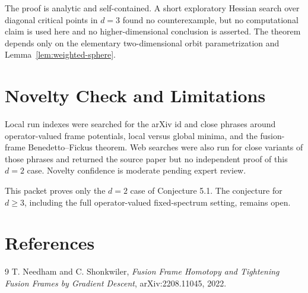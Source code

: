 \documentclass[11pt]{article}
\begin{document}
The proof is analytic and self-contained. A short exploratory Hessian search over diagonal critical points in \(d=3\) found no counterexample, but no computational claim is used here and no higher-dimensional conclusion is asserted. The theorem depends only on the elementary two-dimensional orbit parametrization and Lemma~\ref{lem:weighted-sphere}.

\section*{Novelty Check and Limitations}

Local run indexes were searched for the arXiv id and close phrases around operator-valued frame potentials, local versus global minima, and the fusion-frame Benedetto--Fickus theorem. Web searches were also run for close variants of those phrases and returned the source paper but no independent proof of this \(d=2\) case. Novelty confidence is moderate pending expert review.

This packet proves only the \(d=2\) case of Conjecture 5.1. The conjecture for \(d\ge 3\), including the full operator-valued fixed-spectrum setting, remains open.

\section*{References}

\begin{thebibliography}{9}
T. Needham and C. Shonkwiler,
\emph{Fusion Frame Homotopy and Tightening Fusion Frames by Gradient Descent},
arXiv:2208.11045, 2022.
\end{thebibliography}
\end{document}
